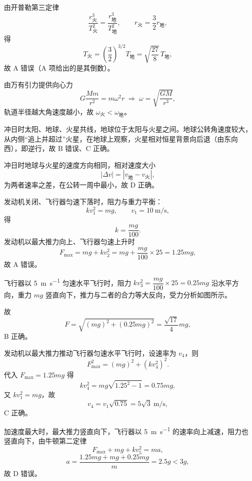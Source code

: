 \begin{answer}
由开普勒第三定律
\[
  \frac{r_{\text{火}}^{3}}{T_{\text{火}}^{2}}=\frac{r_{\text{地}}^{3}}{T_{\text{地}}^{2}},
  \qquad r_{\text{火}}=\frac{3}{2}r_{\text{地}},
\]
得
\[
  T_{\text{火}}=\left(\frac{3}{2}\right)^{3/2}T_{\text{地}}
  =\sqrt{\frac{27}{8}}\,T_{\text{地}},
\]
故 A 错误（A 项给出的是其倒数）。

由万有引力提供向心力
\[
  G\frac{Mm}{r^{2}}=m\omega^{2}r
  \;\Longrightarrow\;
  \omega=\sqrt{\frac{GM}{r^{3}}},
\]
轨道半径越大角速度越小，故 $\omega_{\text{火}}<\omega_{\text{地}}$。

冲日时太阳、地球、火星共线，地球位于太阳与火星之间。地球公转角速度较大，从内侧“追上并超过”火星，在地球上观察，火星相对恒星背景向后退（由东向西），即逆行，故 B 错误、C 正确。

冲日时地球与火星的速度方向相同，相对速度大小
\[
  |\Delta v|=|v_{\text{地}}-v_{\text{火}}|,
\]
为两者速率之差，在公转一周中最小，故 D 正确。
\end{answer}

\begin{answer}
发动机关闭、飞行器匀速下落时，阻力与重力平衡：
\[
  kv_{1}^{2}=mg,\qquad v_{1}=\SI{10}{\metre\per\second},
\]
得
\[
  k=\frac{mg}{100}.
\]
发动机以最大推力向上、飞行器匀速上升时
\[
  F_{\max}=mg+kv_{2}^{2}
  =mg+\frac{mg}{100}\times25
  =1.25mg,
\]
故 A 错误。

飞行器以 \SI{5}{\metre\per\second} 匀速水平飞行时，阻力 $kv_{3}^{2}=\dfrac{mg}{100}\times25=0.25mg$ 沿水平方向，重力 $mg$ 竖直向下，推力与二者的合力等大反向，受力分析如图所示。


故
\[
  F=\sqrt{(mg)^{2}+(0.25mg)^{2}}
  =\frac{\sqrt{17}}{4}mg,
\]
B 正确。

发动机以最大推力推动飞行器匀速水平飞行时，设速率为 $v_{4}$，则
\[
  F_{\max}^{2}=(mg)^{2}+(kv_{4}^{2})^{2}.
\]
代入 $F_{\max}=1.25mg$ 得
\[
  kv_{4}^{2}=mg\sqrt{1.25^{2}-1}=0.75mg,
\]
又 $kv_{1}^{2}=mg$，故
\[
  v_{4}=v_{1}\sqrt{0.75}=5\sqrt{3}~\si{\metre\per\second},
\]
C 正确。

加速度最大时，最大推力竖直向下，飞行器以 \SI{5}{\metre\per\second} 的速率向上减速，阻力也竖直向下，由牛顿第二定律
\[
  F_{\max}+mg+kv_{5}^{2}=ma,
\]
\[
  a=\frac{1.25mg+mg+0.25mg}{m}=2.5g<3g,
\]
故 D 错误。
\end{answer}

